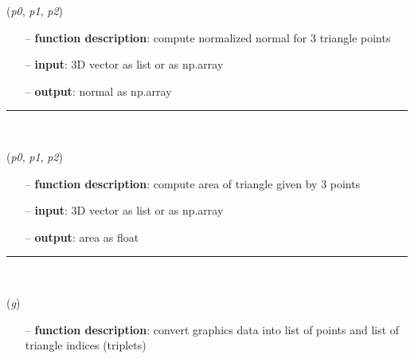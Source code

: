 \begin{itemize}[leftmargin=1.4cm]
\begin{itemize}[leftmargin=1.4cm]
\begin{itemize}[leftmargin=0.5cm]
\begin{itemize}[leftmargin=1.4cm]
\begin{itemize}[leftmargin=1.4cm]
\begin{itemize}[leftmargin=0.5cm]
\begin{itemize}[leftmargin=1.4cm]
\begin{itemize}[leftmargin=0.5cm]
\begin{flushleft}
\label{sec:graphicsDataUtilities:ComputeTriangleNormal}
({\it p0}, {\it p1}, {\it p2})
\end{flushleft}
\setlength{\itemindent}{0.7cm}
\begin{itemize}[leftmargin=0.7cm]
\item[--]
{\bf function description}: compute normalized normal for 3 triangle points
\item[--]
{\bf input}: 3D vector as list or as np.array
\item[--]
{\bf output}: normal as np.array
\vspace{12pt}\end{itemize}
%
\noindent\rule{8cm}{0.75pt}\vspace{1pt} \\ 
\begin{flushleft}
\label{sec:graphicsDataUtilities:ComputeTriangleArea}
({\it p0}, {\it p1}, {\it p2})
\end{flushleft}
\setlength{\itemindent}{0.7cm}
\begin{itemize}[leftmargin=0.7cm]
\item[--]
{\bf function description}: compute area of triangle given by 3 points
\item[--]
{\bf input}: 3D vector as list or as np.array
\item[--]
{\bf output}: area as float
\vspace{12pt}\end{itemize}
%
\noindent\rule{8cm}{0.75pt}\vspace{1pt} \\ 
\begin{flushleft}
\label{sec:graphicsDataUtilities:GraphicsData2PointsAndTrigs}
({\it g})
\end{flushleft}
\setlength{\itemindent}{0.7cm}
\begin{itemize}[leftmargin=0.7cm]
\item[--]
{\bf function description}: convert graphics data into list of points and list of triangle indices (triplets)

\end{itemize}
\end{itemize}
\end{itemize}
\end{itemize}
\end{itemize}
\end{itemize}
\end{itemize}
\end{itemize}
\end{itemize}
